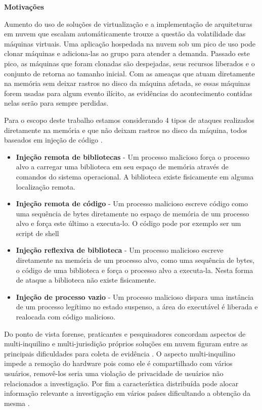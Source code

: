 \documentclass[
	12pt,				%
	openright,			%
	oneside,			%
	a4paper,			%
	english,			%
	french,				%
	spanish,			%
	brazil,				%
	]{abntex2}
\begin{document}
\textbf{Motivações}

Aumento do uso de soluções de virtualização e a implementação de arquiteturas em nuvem que escalam automáticamente \cite{Amazon2016} trouxe a questão da volatilidade 
das máquinas virtuais. Uma aplicação hospedada na nuvem sob um pico de uso pode clonar máquinas e adiciona-las ao grupo para atender a demanda. Passado 
este pico, as máquinas que foram clonadas são despejadas, seus recursos liberados e o conjunto de retorna ao tamanho inicial. Com as ameaças que atuam diretamente 
na memória sem deixar rastros no disco da máquina afetada, se essas máquinas forem usadas para algum evento ilícito, as evidências do acontecimento contidas nelas 
serão para sempre perdidas.

Para o escopo deste trabalho estamos considerando 4 tipos de ataques realizados diretamente na memória e que não deixam rastros no disco da máquina, todos baseados 
em injeção de código \cite{Case2014}.

\begin{itemize}
 \item \textbf{Injeção remota de bibliotecas} - Um processo malicioso força o processo alvo a carregar uma biblioteca em seu espaço de memória através de comandos do sistema operacional.
 A biblioteca existe fisicamente em alguma localização remota.
 \item \textbf{Injeção remota de código} - Um processo malicioso escreve código como uma sequência de bytes diretamente no espaço de memória de um processo alvo e força este 
 último a executa-lo. O código pode por exemplo ser um script de shell
 \item \textbf{Injeção reflexiva de biblioteca} - Um processo malicioso escreve diretamente na memória de um processo alvo, como uma sequência de bytes, o código de uma biblioteca
 e força o processo alvo a executa-la. Nesta forma de ataque a biblioteca não existe fisicamente.
 \item \textbf{Injeção de processo vazio} - Um processo malicioso dispara uma instância de um processo legítimo no estado suspenso, a área do executável é liberada e realocada com 
 código malicioso.
\end{itemize}

Do ponto de vista forense, praticantes e pesquisadores concordam aspectos de multi-inquilino e multi-jurisdição próprios soluções em nuvem figuram entre as principais 
dificuldades para coleta de evidência \cite{Bash2015a}. O aspecto multi-inquilino impede a remoção do hardware pois como ele é compartilhado com vários usuários, 
removê-los seria uma violação de privacidade de usuários não relacionados a investigação. Por fim a característica distribuída pode alocar informação relevante a 
investigação em vários países dificultando a obtenção da mesma \cite{Dykstra2012a}.
\end{document}
